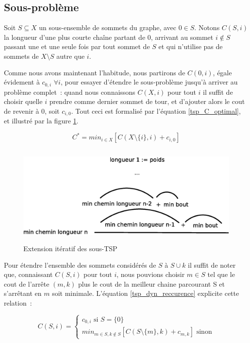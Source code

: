 \subsection{Sous-problème}

Soit $S \subseteq X$ un sous-ensemble de sommets du graphe, avec $0 \in S$. Notons $C(S,i)$ la longueur d'une plus courte chaîne partant de $0$, arrivant au sommet $i \not\in S$ passant une et une seule fois par tout sommet de $S$ et qui n'utilise pas de sommets de $X \setminus S$ autre que $i$. 

Comme nous avons maintenant l'habitude, nous partirons de $C({0}, i)$, égale évidement à $c_{0,i}$ $\forall i$, pour essayer d'étendre le sous-problème jusqu'à arriver au problème complet~: quand nous connaissons $C(X,i)$ pour tout $i$ il suffit de choisir quelle $i$ prendre comme dernier sommet de tour, et d'ajouter alors le cout de revenir à $0$, soit $c_{i,0}$. Tout ceci est formalisé par l'équation \ref{tsp_C_optimal}, et illustré par la figure \ref{extension_tsp_chemins}.

\begin{equation}
\label{tsp_C_optimal}
C^* = min_{i \in X}[ C(X \setminus \{i\},i) + c_{i,0} ]
\end{equation}

\begin{figure}[!ht]
\begin{center}
\includegraphics[height=5cm]{../images/tspDyn.eps}
\end{center}
\caption{Extension itératif des sous-TSP}
\label{extension_tsp_chemins}
\end{figure}

Pour étendre l'ensemble des sommets considérés de $S$ à $S \cup {k}$ il suffit de noter que, connaissant $C(S,i)$ pour tout $i$, nous pouvions choisir $m \in S$ tel que le cout de l'arrête $(m,k)$ plus le cout de la meilleur chaine parcourant S et s'arrêtant en $m$ soit minimale. L'équation \ref{tsp_dyn_reccurence} explicite cette relation~:

\begin{equation}
\label{tsp_dyn_reccurence}
C(S, i) =
\begin{cases}
c_{0,i} \text{ si } S = \{0\} \\
min_{m \in S, k \not\in S}[ C(S\setminus\{m\}, k) + c_{m,k} ] \text{ sinon}
\end{cases}
\end{equation}

